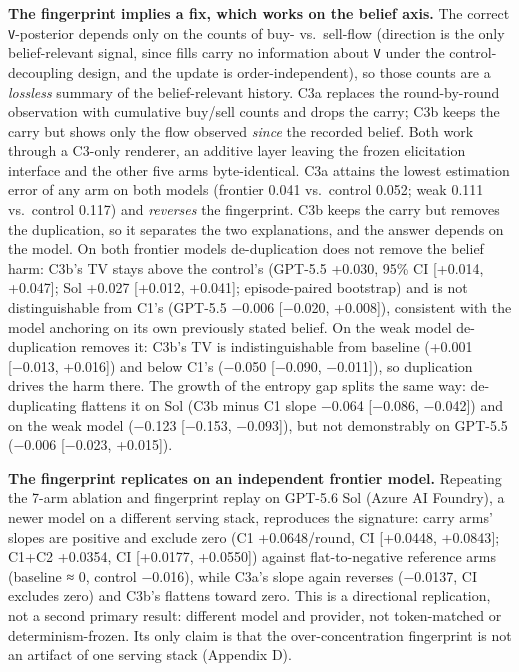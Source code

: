 \documentclass[
  10pt,
]{article}
\begin{document}
\textbf{The fingerprint implies a fix, which works on the belief axis.} The correct \texttt{V}-posterior depends only on the counts of buy- vs.~sell-flow (direction is the only belief-relevant signal, since fills carry no information about \texttt{V} under the control-decoupling design, and the update is order-independent), so those counts are a \emph{lossless} summary of the belief-relevant history. C3a replaces the round-by-round observation with cumulative buy/sell counts and drops the carry; C3b keeps the carry but shows only the flow observed \emph{since} the recorded belief. Both work through a C3-only renderer, an additive layer leaving the frozen elicitation interface and the other five arms byte-identical. C3a attains the lowest estimation error of any arm on both models (frontier 0.041 vs.~control 0.052; weak 0.111 vs.~control 0.117) and \emph{reverses} the fingerprint. C3b keeps the carry but removes the duplication, so it separates the two explanations, and the answer depends on the model. On both frontier models de-duplication does not remove the belief harm: C3b's TV stays above the control's (GPT-5.5 +0.030, 95\% CI {[}+0.014, +0.047{]}; Sol +0.027 {[}+0.012, +0.041{]}; episode-paired bootstrap) and is not distinguishable from C1's (GPT-5.5 −0.006 {[}−0.020, +0.008{]}), consistent with the model anchoring on its own previously stated belief. On the weak model de-duplication removes it: C3b's TV is indistinguishable from baseline (+0.001 {[}−0.013, +0.016{]}) and below C1's (−0.050 {[}−0.090, −0.011{]}), so duplication drives the harm there. The growth of the entropy gap splits the same way: de-duplicating flattens it on Sol (C3b minus C1 slope −0.064 {[}−0.086, −0.042{]}) and on the weak model (−0.123 {[}−0.153, −0.093{]}), but not demonstrably on GPT-5.5 (−0.006 {[}−0.023, +0.015{]}).

\textbf{The fingerprint replicates on an independent frontier model.} Repeating the 7-arm ablation and fingerprint replay on GPT-5.6 Sol (Azure AI Foundry), a newer model on a different serving stack, reproduces the signature: carry arms' slopes are positive and exclude zero (C1 +0.0648/round, CI {[}+0.0448, +0.0843{]}; C1+C2 +0.0354, CI {[}+0.0177, +0.0550{]}) against flat-to-negative reference arms (baseline ≈ 0, control −0.016), while C3a's slope again reverses (−0.0137, CI excludes zero) and C3b's flattens toward zero. This is a directional replication, not a second primary result: different model and provider, not token-matched or determinism-frozen. Its only claim is that the over-concentration fingerprint is not an artifact of one serving stack (Appendix D).
\end{document}
